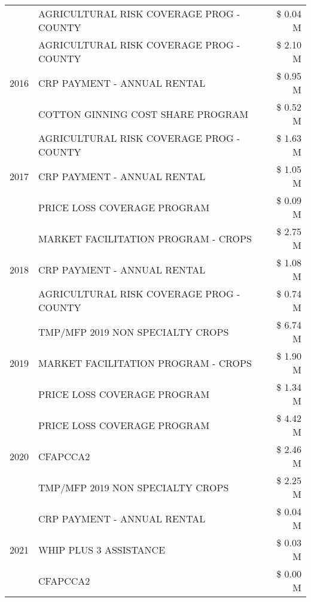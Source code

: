 \begin{tabular}{llr}
 & AGRICULTURAL RISK COVERAGE PROG - COUNTY & \$ 0.04 M \\
\cline{1-3}
\multirow[t]{3}{*}{2016} & AGRICULTURAL RISK COVERAGE PROG - COUNTY & \$ 2.10 M \\
 & CRP PAYMENT - ANNUAL RENTAL & \$ 0.95 M \\
 & COTTON GINNING COST SHARE PROGRAM & \$ 0.52 M \\
\cline{1-3}
\multirow[t]{3}{*}{2017} & AGRICULTURAL RISK COVERAGE PROG - COUNTY & \$ 1.63 M \\
 & CRP PAYMENT - ANNUAL RENTAL & \$ 1.05 M \\
 & PRICE LOSS COVERAGE PROGRAM & \$ 0.09 M \\
\cline{1-3}
\multirow[t]{3}{*}{2018} & MARKET FACILITATION PROGRAM - CROPS & \$ 2.75 M \\
 & CRP PAYMENT - ANNUAL RENTAL & \$ 1.08 M \\
 & AGRICULTURAL RISK COVERAGE PROG - COUNTY & \$ 0.74 M \\
\cline{1-3}
\multirow[t]{3}{*}{2019} & TMP/MFP 2019 NON SPECIALTY CROPS & \$ 6.74 M \\
 & MARKET FACILITATION PROGRAM - CROPS & \$ 1.90 M \\
 & PRICE LOSS COVERAGE PROGRAM & \$ 1.34 M \\
\cline{1-3}
\multirow[t]{3}{*}{2020} & PRICE LOSS COVERAGE PROGRAM & \$ 4.42 M \\
 & CFAPCCA2 & \$ 2.46 M \\
 & TMP/MFP 2019 NON SPECIALTY CROPS & \$ 2.25 M \\
\cline{1-3}
\multirow[t]{3}{*}{2021} & CRP PAYMENT - ANNUAL RENTAL & \$ 0.04 M \\
 & WHIP PLUS 3 ASSISTANCE & \$ 0.03 M \\
 & CFAPCCA2 & \$ 0.00 M \\
\cline{1-3}
\bottomrule
\end{tabular}
